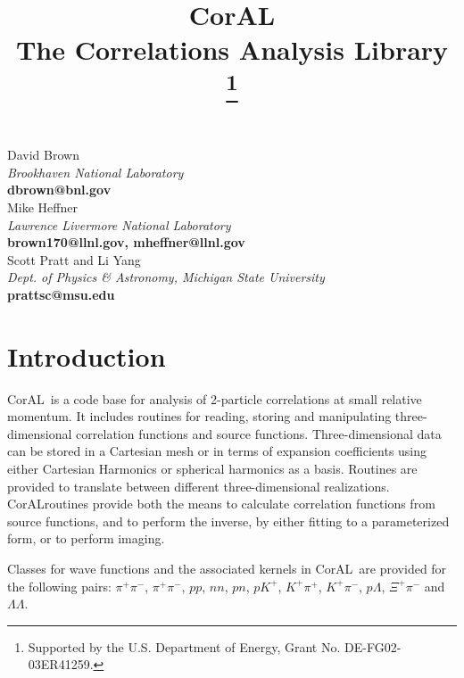 \documentclass[10pt]{article}
\newcommand{\coral}{CorAL}
\begin{document}
\title{\coral\\
\Large \bf The Correlations Analysis Library
\thanks{Supported by the U.S. Department of Energy, Grant No.  DE-FG02-03ER41259.}
}

\maketitle

\begin{center}
David Brown\\
{\it Brookhaven National Laboratory}\\
{\small \bf dbrown@bnl.gov}\\
Mike Heffner\\
{\it Lawrence Livermore National Laboratory}\\
{\small \bf brown170@llnl.gov, mheffner@llnl.gov}\\
\vspace*{8pt}
Scott Pratt and Li Yang\\
{\it Dept. of Physics \& Astronomy, Michigan State University}\\
{\small\bf prattsc@msu.edu}

\end{center}

\vspace*{0.4in}

\tableofcontents

\newpage

\section{Introduction}

\coral\ is a code base for analysis of 2-particle correlations at small relative momentum. It includes routines for reading, storing and manipulating three-dimensional correlation functions and source functions. Three-dimensional data can be stored in a Cartesian mesh or in terms of expansion coefficients using either Cartesian Harmonics or spherical harmonics as a basis. Routines are provided to translate between different three-dimensional realizations. \coral routines provide both the means to calculate correlation functions from source functions, and to perform the inverse, by either fitting to a parameterized form, or to perform imaging.

Classes for wave functions and the associated kernels in \coral\ are provided for the following pairs: $\pi^+\pi^-$, $\pi^+\pi^-$, $pp$, $nn$, $pn$, $pK^+$, $K^+\pi^+$, $K^+\pi^-$, $p\Lambda$, $\Xi^+\pi^-$ and $\Lambda\Lambda$. 
\end{document}
